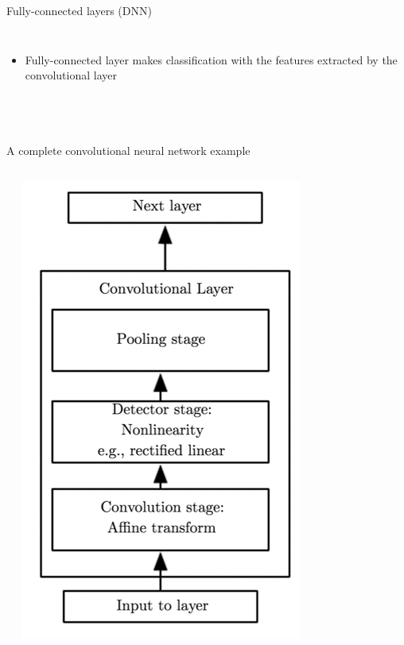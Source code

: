 \documentclass{beamer}
\begin{document}
\begin{CJK*}{UTF8}{gbsn}
\begin{frame}{Fully-connected layers (DNN)}
\begin{columns}
\begin{minipage}[c][0.45\textheight][c]{\linewidth}
\begin{itemize}
\begin{itemize}
\end{itemize}
\item Fully-connected layer makes classification with the features extracted by the convolutional layer

\end{itemize}

\end{minipage}
\end{columns}  
\end{frame}

\begin{frame}{A complete convolutional neural network example}
\begin{columns}
\includegraphics[width=\textwidth]{figures/CNN1}

\end{columns}
\end{frame}
\end{CJK*}
\end{document}

